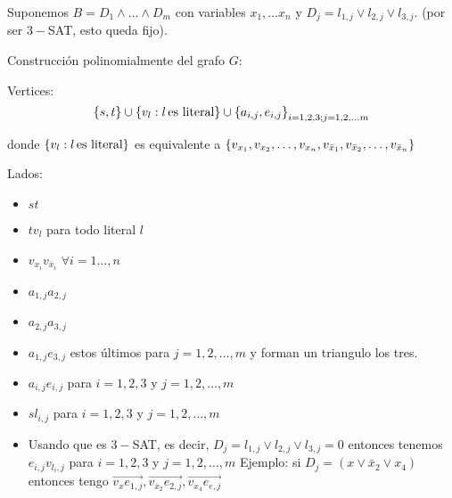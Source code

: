 \documentclass[12pt,a4paper]{article}
\begin{document}
Suponemos $B = D_{1} \wedge \ldots \wedge D_{m}$ con variables $x_{1}, \ldots x_{n}$ 
y $D_{j} = l_{1,j} \vee l_{2,j} \vee l_{3,j}$. (por ser $3-$SAT, esto queda fijo).
\medskip

Construcción polinomialmente del grafo $G$:
\medskip

Vertices:
$$\left\lbrace s,t \right\rbrace \cup \left\lbrace v_{l}: l\,\text{es literal} \right\rbrace \cup \left\lbrace a_{i,j},e_{i,j} \right\rbrace_{i= 1,2,3; j = 1,2,\ldots m}$$

donde $\left\lbrace v_{l}: l\,\text{es literal} \right\rbrace$ es equivalente a $\left\lbrace v_{x_{1}},v_{x_{2}},\ldots ,v_{x_{n}},v_{\bar{x}_{1}},v_{\bar{x}_{2}},\ldots,v_{\bar{x}_{n}} \right\rbrace$
\medskip

Lados:
\begin{itemize}
    \item $st$
    \item $tv_{l}$ para todo literal $l$
    \item $v_{x_{i}}v_{\bar{x}_{i}}\,\, \forall i=1\ldots,n$
    \item $a_{1,j}a_{2,j}$
    \item $a_{2,j}a_{3,j}$
    \item $a_{1,j}e_{3,j}$ estos últimos para $j = 1,2,\ldots,m$ y forman un triangulo los tres.
    \item $a_{i,j}e_{i,j}$ para $i = 1,2,3$ y $j = 1,2,\ldots,m$
    \item $sl_{i,j}$ para $i = 1,2,3$ y $j = 1,2,\ldots,m$
    \item Usando que es $3-$SAT, es decir, $D_{j} = l_{1,j} \vee l_{2,j} \vee l_{3,j} = 0$ entonces tenemos $e_{i,j}v_{l_{i},j}$ para $i = 1,2,3$ y $j = 1,2,\ldots,m$
        Ejemplo: si $D_{j} = (x \vee \bar{x}_{2}\vee x_{4})$ entonces tengo $\overrightarrow{v_{x}e_{1,j}}, \overrightarrow{v_{\bar{x}_{2}}e_{2,j}}, \overrightarrow{v_{x_{4}}e_{e,j}}$
\end{itemize}
\end{document}
